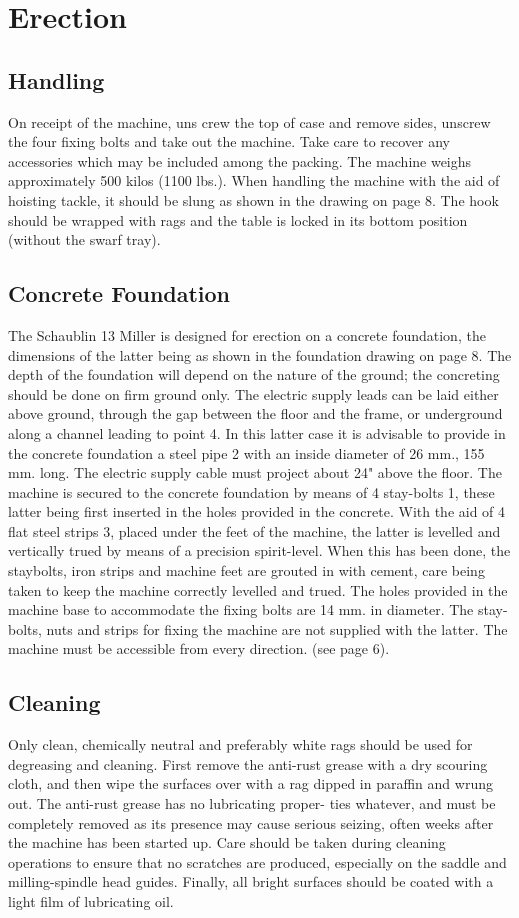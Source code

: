 \chapter{Erection}

\section*{Handling}
On receipt of the machine, uns crew the top of case and remove
sides, unscrew the four fixing bolts and take out the machine.
Take care to recover any accessories which may be included among
the packing.
The machine weighs approximately 500 kilos (1100 lbs.). When
handling the machine with the aid of hoisting tackle, it should
be slung as shown in the drawing on page 8. The hook should be
wrapped with rags and the table is locked in its bottom position
(without the swarf tray).

\section*{Concrete Foundation}
The Schaublin 13 Miller is designed for erection on a concrete
foundation, the dimensions of the latter being as shown in the
foundation drawing on page 8. The depth of the foundation will
depend on the nature of the ground; the concreting should be done
on firm ground only.
The electric supply leads can be laid either above ground,
through the gap between the floor and the frame, or underground
along a channel leading to point 4. In this latter case it is
advisable to provide in the concrete foundation a steel pipe 2
with an inside diameter of 26 mm., 155 mm. long. The electric
supply cable must project about 24" above the floor.
The machine is secured to the concrete foundation by means of
4 stay-bolts 1, these latter being first inserted in the holes
provided in the concrete. With the aid of 4 flat steel strips 3,
placed under the feet of the machine, the latter is levelled
and vertically trued by means of a precision spirit-level.
When this has been done, the staybolts, iron strips and machine
feet are grouted in with cement, care being taken to keep the
machine correctly levelled and trued.
The holes provided in the machine base to accommodate the fixing
bolts are 14 mm. in diameter. The stay-bolts, nuts and strips
for fixing the machine are not supplied with the latter.
The machine must be accessible from every direction. (see page 6). %

\section*{Cleaning}
Only clean, chemically neutral and preferably white rags should
be used for degreasing and cleaning.
First remove the anti-rust grease with a dry scouring cloth,
and then wipe the surfaces over with a rag dipped in paraffin
and wrung out. The anti-rust grease has no lubricating proper-
ties whatever, and must be completely removed as its presence
may cause serious seizing, often weeks after the machine has
been started up. Care should be taken during cleaning operations
to ensure that no scratches are produced, especially on the
saddle and milling-spindle head guides.
Finally, all bright surfaces should be coated with a light film
of lubricating oil.
